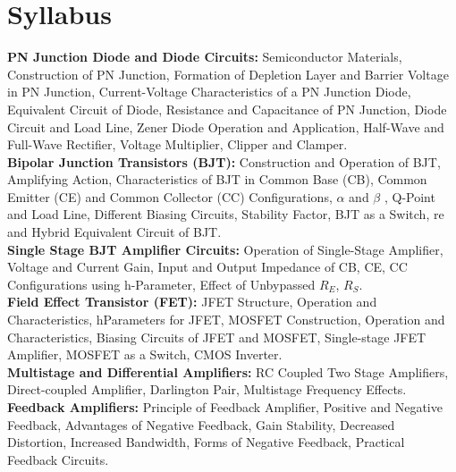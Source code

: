 \documentclass[a4aper,12pt]{report}
\begin{document}
    \chapter*{Syllabus}
    \thispagestyle{empty}
    \vspace*{-2.7cm}
    \textbf{PN Junction Diode and Diode Circuits:} Semiconductor Materials, Construction
of PN Junction, Formation of Depletion Layer and Barrier Voltage in PN Junction,
Current-Voltage Characteristics of a PN Junction Diode, Equivalent Circuit of
Diode, Resistance and Capacitance of PN Junction, Diode Circuit and Load Line,
Zener Diode Operation and Application, Half-Wave and Full-Wave Rectifier, Voltage Multiplier, Clipper and Clamper. \\ [5pt]
\textbf{Bipolar Junction Transistors (BJT):} Construction and Operation of BJT,
Amplifying Action, Characteristics of BJT in Common Base (CB), Common
Emitter (CE) and Common Collector (CC) Configurations, $\alpha$ and $\beta$ , Q-Point and Load Line, Different Biasing Circuits, Stability Factor, BJT as a Switch, re and
Hybrid Equivalent Circuit of BJT. \\ [5pt]
\textbf{Single Stage BJT Amplifier Circuits: }Operation of Single-Stage Amplifier,
Voltage and Current Gain, Input and Output Impedance of CB, CE, CC
Configurations using h-Parameter, Effect of Unbypassed $R_E$, $R_S$. \\ [5pt]
\textbf{Field Effect Transistor (FET): }JFET Structure, Operation and Characteristics, hParameters for JFET, MOSFET Construction, Operation and Characteristics,
Biasing Circuits of JFET and MOSFET, Single-stage JFET Amplifier, MOSFET as
a Switch, CMOS Inverter. \\ [5pt]
\textbf{Multistage and Differential Amplifiers: } RC Coupled Two Stage Amplifiers,
Direct-coupled Amplifier, Darlington Pair, Multistage Frequency Effects. \\ [5pt]
\textbf{Feedback Amplifiers: } Principle of Feedback Amplifier, Positive and Negative
Feedback, Advantages of Negative Feedback, Gain Stability, Decreased Distortion,
Increased Bandwidth, Forms of Negative Feedback, Practical Feedback Circuits. 
\newpage
\end{document}
